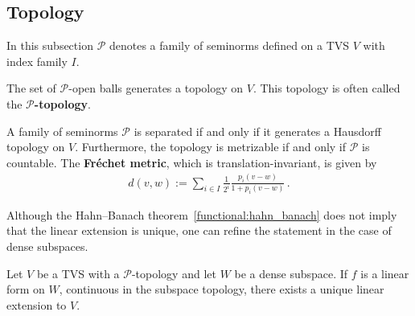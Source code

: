 \subsection{Topology}

    In this subsection $\mathscr{P}$ denotes a family of seminorms defined on a TVS $V$ with index family $I$.


    \begin{property}
        The set of $\mathscr{P}$-open balls generates a topology on $V$. This topology is often called the \textbf{$\mathscr{P}$-topology}.
    \end{property}

    \begin{property}\label{functional:separated_metric}
        A family of seminorms $\mathcal{P}$ is separated if and only if it generates a Hausdorff topology on $V$. Furthermore, the topology is metrizable if and only if $\mathcal{P}$ is countable. The \textbf{Fr\'echet metric}, which is translation-invariant, is given by
        \begin{gather}
            d(v,w) := \sum_{i\in I}\frac{1}{2^i}\frac{p_i(v-w)}{1 + p_i(v-w)}\,.
        \end{gather}
    \end{property}

    Although the Hahn--Banach theorem~\ref{functional:hahn_banach} does not imply that the linear extension is unique, one can refine the statement in the case of dense subspaces.
    \begin{result}
        Let $V$ be a TVS with a $\mathscr{P}$-topology and let $W$ be a dense subspace. If $f$ is a linear form on $W$, continuous in the subspace topology, there exists a unique linear extension to $V$.
    \end{result}

